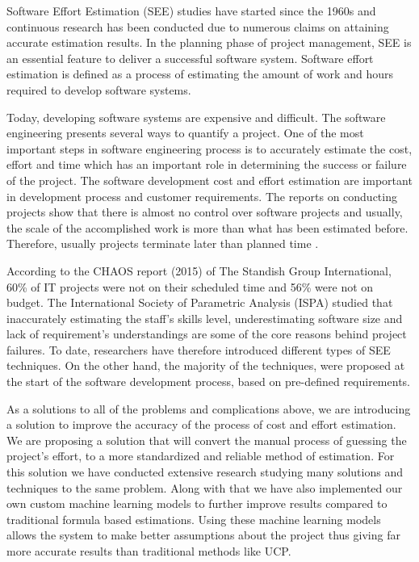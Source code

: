 Software Effort Estimation (SEE) studies have started since the 1960s and continuous research has been conducted due to numerous claims on attaining accurate
estimation results. In the planning phase
of project management, SEE is an essential feature to deliver a successful software
system. Software effort estimation is defined as a process of estimating the amount of
work and hours required to develop software systems. 

Today, developing software systems are
expensive and difficult. The software engineering presents several ways to quantify a
project. One of the most important steps in software engineering process is to
accurately estimate the cost, effort and time which has an important role in determining
the success or failure of the project. The software development cost and effort
estimation are important in development process and customer requirements. The
reports on conducting projects show that there is almost no control over software
projects and usually, the scale of the accomplished work is more than what has been
estimated before. Therefore, usually projects terminate later than planned time .

According to the CHAOS report (2015) of The Standish Group International,
60\% of IT projects were not on their scheduled time and 56\% were not on budget. The
International Society of Parametric Analysis (ISPA) studied that inaccurately
estimating the staff’s skills level, underestimating software size and lack of
requirement’s understandings are some of the core reasons behind project failures. To date, researchers have therefore introduced different types of SEE
techniques. On the other hand, the majority of the techniques, were proposed at the
start of the software development process, based on pre-defined requirements.

As a solutions to all of the problems and complications above, we are introducing a solution to improve the accuracy of the process of cost and effort estimation. We are proposing a solution that will convert the manual process of guessing the project's effort, to a more standardized and reliable method of estimation. For this solution we have conducted extensive research studying many solutions and techniques to the same problem. Along with that we have also implemented our own custom machine learning models to further improve results compared to traditional formula based estimations. Using these machine learning models allows the system to make better assumptions about the project thus giving far more accurate results than traditional methods like UCP. 

